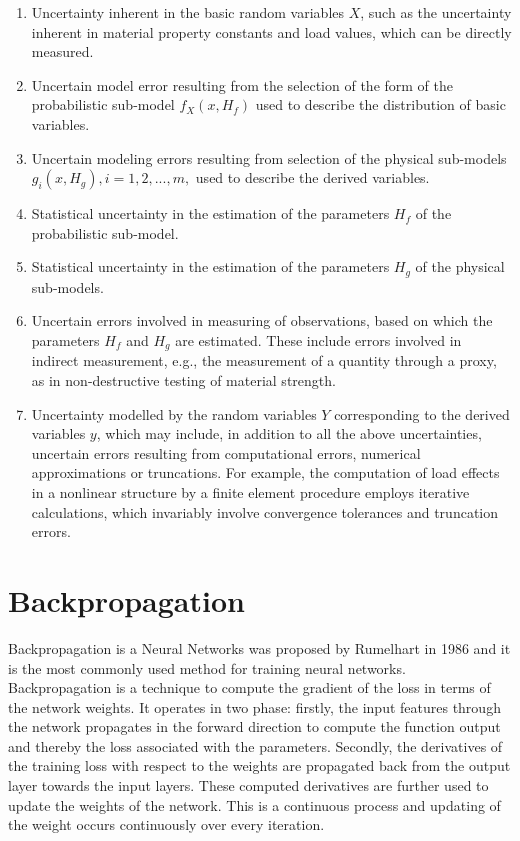 \begin{enumerate}
    \item Uncertainty inherent in the basic random variables $X$, such as the uncertainty inherent in material property constants and load values, which can be directly measured.
    \item Uncertain model error resulting from the selection of the form of the probabilistic sub-model $f_{X}(x,H_{f})$ used to describe the distribution of basic variables.
    \item  Uncertain modeling errors resulting from selection of the physical sub-models $g_{i}(x,H_{g}), i = 1,2,...,m,$ used to describe the derived variables.
    \item  Statistical uncertainty in the estimation of the parameters $H_f$ of the probabilistic sub-model.
    \item  Statistical uncertainty in the estimation of the parameters $H_g$ of the physical sub-models.
    \item  Uncertain errors involved in measuring of observations, based on which the parameters $H_f$ and $H_g$  are estimated. These include errors involved in indirect measurement, e.g., the measurement of a quantity through a proxy, as in non-destructive testing of material strength.
    \item Uncertainty modelled by the random variables $Y$ corresponding to the derived variables $y$, which may include, in addition to all the above uncertainties, uncertain errors resulting from computational errors, numerical approximations or truncations. For example, the computation of load effects in a nonlinear structure by a finite element procedure employs iterative calculations, which invariably involve convergence tolerances and truncation errors.
\end{enumerate} 

\section{Backpropagation}

Backpropagation is a Neural Networks was proposed by Rumelhart \cite{Rumelhart} in 1986 and it is the most commonly used method for training neural networks. Backpropagation is a technique to compute the gradient of the loss in terms of the network weights. It operates in two phase: firstly, the input features through the network propagates in the forward direction to compute the function output and thereby the loss associated with the parameters. Secondly, the derivatives of the training loss with respect to the weights
are propagated back from the output layer towards the input layers.
These computed derivatives are further used to update the weights of the network. This is a continuous process and updating of the weight occurs continuously over every iteration. 

